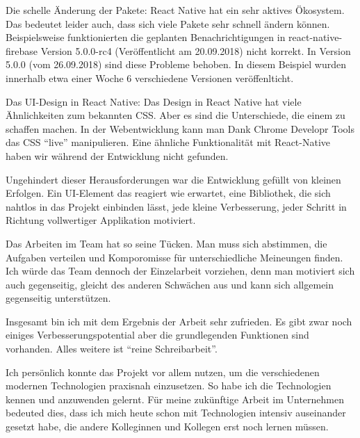 Die schelle Änderung der Pakete:
React Native hat ein sehr aktives Ökosystem.
Das bedeutet leider auch,
dass sich viele Pakete sehr schnell ändern können.
Beispielsweise funktionierten die geplanten Benachrichtigungen in react-native-firebase Version 5.0.0-rc4 (Veröffentlicht am 20.09.2018) nicht korrekt.
In Version 5.0.0 (vom 26.09.2018) sind diese Probleme behoben. In diesem Beispiel wurden innerhalb etwa einer Woche 6 verschiedene Versionen veröffenlticht.

Das UI-Design in React Native:
Das Design in React Native hat viele Ähnlichkeiten zum bekannten CSS.
Aber es sind die Unterschiede, die einem zu schaffen machen.
In der Webentwicklung kann man Dank Chrome Developr Tools das CSS \enquote{live} manipulieren.
Eine ähnliche Funktionalität mit React-Native haben wir während der Entwicklung nicht gefunden.

Ungehindert dieser Herausforderungen war die Entwicklung gefüllt von kleinen Erfolgen.
Ein UI-Element das reagiert wie erwartet,
eine Bibliothek, die sich nahtlos in das Projekt einbinden lässt,
jede kleine Verbesserung, jeder Schritt in Richtung vollwertiger Applikation motiviert.

Das Arbeiten im Team hat so seine Tücken.
Man muss sich abstimmen, die Aufgaben verteilen und Komporomisse für unterschiedliche Meineungen finden.
Ich würde das Team dennoch der Einzelarbeit vorziehen, denn man motiviert sich auch gegenseitig,
gleicht des anderen Schwächen aus und kann sich allgemein gegenseitig unterstützen.

Insgesamt bin ich mit dem Ergebnis der Arbeit sehr zufrieden.
Es gibt zwar noch einiges Verbesserungspotential aber die grundlegenden Funktionen sind vorhanden.
Alles weitere ist \enquote{reine Schreibarbeit}.

Ich persönlich konnte das Projekt vor allem nutzen, um die verschiedenen modernen Technologien praxisnah einzusetzen.
So habe ich die Technologien kennen und anzuwenden gelernt.
Für meine zukünftige Arbeit im Unternehmen bedeuted dies,
dass ich mich heute schon mit Technologien intensiv auseinander gesetzt habe,
die andere Kolleginnen und Kollegen erst noch lernen müssen.